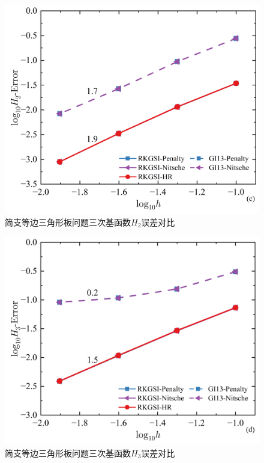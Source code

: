 \newpage
\begin{figure}[H]
    \centering
    \includegraphics[scale=0.5]{figure/PHR/T/CH2.png}
    \caption{简支等边三角形板问题三次基函数$H_2$误差对比}
\end{figure}
\begin{figure}[H]
    \centering
    \includegraphics[scale=0.5]{figure/PHR/T/CH3.png}
    \caption{简支等边三角形板问题三次基函数$H_3$误差对比}
\end{figure}
\newpage
